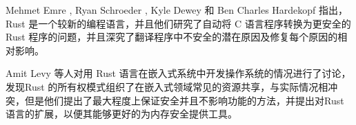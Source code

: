\documentclass{article}
\begin{document}
Mehmet Emre , Ryan Schroeder , Kyle Dewey 和 Ben Charles Hardekopf 指出，Rust 是一个较新的编程语言，并且他们研究了自动将 C 语言程序转换为更安全的 Rust 程序的问题，并且深究了翻译程序中不安全的潜在原因及修复每个原因的相对影响。\supercite{ref17}

Amit Levy 等人对用 Rust 语言在嵌入式系统中开发操作系统的情况进行了讨论，发现Rust 的所有权模式组织了在嵌入式领域常见的资源共享，与实际情况相冲突，但是他们提出了最大程度上保证安全并且不影响功能的方法，并提出对Rust语言的扩展，以便其能够更好的为内存安全提供工具。\supercite{ref18}




\newpage


\printbibliography[ title = {参考文献}]
\end{document}
